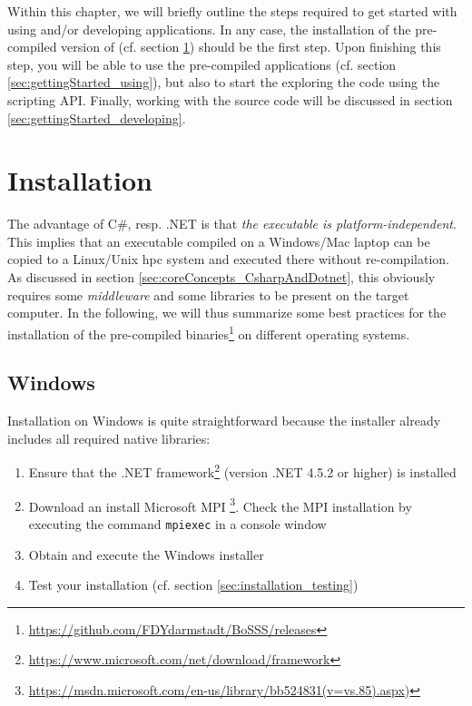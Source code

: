 \documentclass[a4paper,10pt]{report} %
\begin{document}
Within this chapter, we will briefly outline the steps required to get started with using and/or developing \BoSSS{} applications. In any case, the installation of the pre-compiled version of \BoSSS{} (cf. section \ref{sec:gettingStarted_installation}) should be the first step. Upon finishing this step, you will be able to use the pre-compiled \BoSSS{} applications (cf. section \ref{sec:gettingStarted_using}), but also to start the exploring the code using the scripting API. Finally, working with the source code will be discussed in section \ref{sec:gettingStarted_developing}.

\section{Installation}
\label{sec:gettingStarted_installation}
The advantage of C\#, resp. .NET is that \emph{the executable is platform-independent}. This implies that an executable compiled on a Windows/Mac laptop can be copied to a Linux/Unix \ac{hpc} system and executed there without re-compilation. As discussed in section \ref{sec:coreConcepts_CsharpAndDotnet}, this obviously requires some \emph{middleware} and some libraries to be present on the target computer. In the following, we will thus summarize some best practices for the installation of the pre-compiled \BoSSS{} binaries\footnote{\label{note:relases} \url{https://github.com/FDYdarmstadt/BoSSS/releases}} on different operating systems.

\subsection{Windows}
Installation on Windows is quite straightforward because the \BoSSS{} installer already includes all required native libraries:
\begin{enumerate}
	\item Ensure that the .NET framework\footnote{\url{https://www.microsoft.com/net/download/framework}} (version .NET 4.5.2 or higher) is installed 
	\item Download an install Microsoft MPI \footnote{\url{https://msdn.microsoft.com/en-us/library/bb524831(v=vs.85).aspx})}. Check the MPI installation by executing the command \texttt{mpiexec} in a console window
	\item Obtain and execute the \BoSSS{} Windows installer
	\item Test your installation (cf. section \ref{sec:installation_testing})
\end{enumerate}
\end{document}
